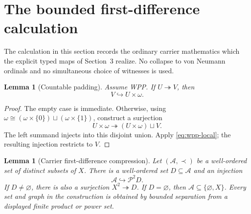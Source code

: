 \documentclass[11pt]{article}
\newtheorem{lemma}[theorem]{Lemma}
\numberwithin{equation}{section}
\theoremstyle{definition}
\theoremstyle{remark}
\newcommand{\Pow}{\mathcal P}
\newcommand{\inj}{\hookrightarrow}
\newcommand{\surj}{\twoheadrightarrow}
\begin{document}
\section{The bounded first-difference calculation}
\label{sec:bounded-calculation}

The calculation in this section records the ordinary carrier mathematics
which the explicit typed maps of Section~3 realize.  No collapse to von
Neumann ordinals and no simultaneous choice of witnesses is used.

\begin{lemma}[Countable padding]\label{lem:padding}
Assume WPP.  If $U\surj V$, then
\begin{equation}
 V\inj U\times\omega.
 \label{eq:padding}
\end{equation}
\end{lemma}

\begin{proof}
The empty case is immediate.  Otherwise, using
\(\omega\cong(\omega\times\{0\})\sqcup(\omega\times\{1\})\), construct a
surjection
\[
 U\times\omega\surj (U\times\omega)\sqcup V.
\]
The left summand injects into this disjoint union.  Apply
\eqref{eq:wpp-local}; the resulting injection restricts to $V$.
\end{proof}

\begin{lemma}[Carrier first-difference compression]
\label{lem:first-difference}
Let $(\mathcal A,\prec)$ be a well-ordered set of distinct subsets of
$X$.  There is a well-ordered set $D\subseteq\mathcal A$ and an injection
\begin{equation}
 \mathcal A\inj\Pow^2D.
 \label{eq:first-difference}
\end{equation}
If $D\neq\varnothing$, there is also a surjection $X^2\surj D$.  If
$D=\varnothing$, then $\mathcal A\subseteq\{\varnothing,X\}$.  Every
set and graph in the construction is obtained by bounded separation from
a displayed finite product or power set.
\end{lemma}
\end{document}
